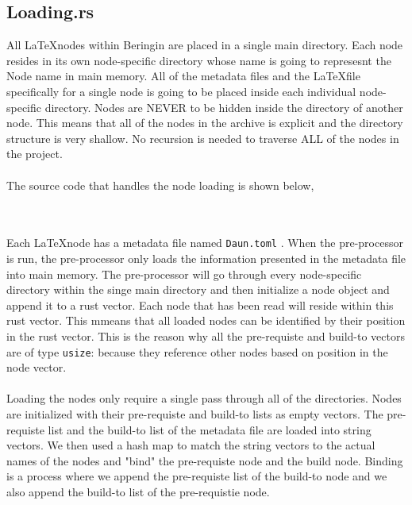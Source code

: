 \documentclass[a4paper, 12pt]{report}
\begin{document}
\begin{center}
\subsection{Loading.rs}
\begin{comment}
\end{comment}
All \LaTeX nodes within Beringin are placed in a single main directory.
Each node resides in its own node-specific directory whose name is going to represesnt the Node name in main memory.
All of the metadata files and the \LaTeX file specifically for a single node is going to be placed inside each individual node-specific directory.
Nodes are NEVER to be hidden inside the directory of another node. 
This means that all of the nodes in the archive is explicit and the directory structure is very shallow.
No recursion is needed to traverse ALL of the nodes in the project.
\\~\\The source code that handles the node loading is shown below,

\\~\\Each \LaTeX node has a metadata file named \texttt{Daun.toml} . 
When the pre-processor is run, the pre-processor only loads the information presented in the metadata file into main memory.
The pre-processor will go through every node-specific directory within the singe main directory and then initialize a node object and append it to a rust vector.
Each node that has been read will reside within this rust vector.
This mmeans that all loaded nodes can be identified by their position in the rust vector.
This is the reason why all the pre-requiste and build-to vectors are of type \texttt{usize}: because they reference other nodes based on position in the node vector.
\\~\\Loading the nodes only require a single pass through all of the directories.
Nodes are initialized with their pre-requiste and build-to lists as empty vectors.
The pre-requiste list and the build-to list of the metadata file are loaded into string vectors.
We then used a hash map to match the string vectors to the actual names of the nodes and "bind" the pre-requiste node and the build node.
Binding is a process where we append the pre-requiste list of the build-to node and we also append the build-to list of the pre-requistie node.


\end{center}
\end{document}
